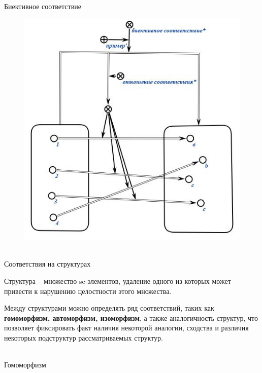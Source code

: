 \documentclass{beamer}
\begin{document}
\begin{frame}{\\Биективное соответствие}
    \topline
    \begin{center}
        \begin{figure}[Hb]
            \centering
            \includegraphics[scale=.45]{figures/sd_correspondences/Bijection.jpeg}
        \end{figure}
    \end{center}
\end{frame}

\begin{frame}{\\Соответствия на структурах}
\topline
\begin{SCn}
Структура – множество sc-элементов, удаление одного из которых может привести к нарушению целостности этого множества.

Между структурами можно определять ряд соответствий, таких как \textbf{гомоморфизм, автоморфизм, изоморфизм}, а также аналогичность структур, что позволяет фиксировать факт наличия некоторой аналогии,
сходства и различия некоторых подструктур рассматриваемых структур.
\end{SCn}
\end{frame}

\begin{frame}{\\Гомоморфизм}
\topline
\begin{SCn}

\end{SCn}
\end{frame}
\end{document}
